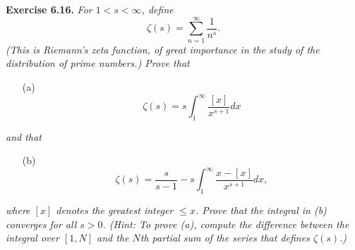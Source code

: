 \documentclass{article}
\begin{document}
\textbf{Exercise 6.16.}
\emph{For $1 < s < \infty$, define
\[
  \zeta(s) = \sum_{n=1}^{\infty} \frac{1}{n^s}.
\]
(This is Riemann's zeta function, of great importance in the study of the
distribution of prime numbers.)
Prove that}
\begin{enumerate}
  \item[(a)]
  \[
    \zeta(s) = s \int_{1}^{\infty} \frac{[x]}{x^{s+1}} dx
  \]
\end{enumerate}
\emph{and that}
\begin{enumerate}
  \item[(b)]
  \[
    \zeta(s) = \frac{s}{s-1} - s \int_{1}^{\infty} \frac{x - [x]}{x^{s+1}} dx,
  \]
\end{enumerate}
\emph{where $[x]$ denotes the greatest integer $\leq x$.
Prove that the integral in (b) converges for all $s > 0$.
(Hint: To prove (a), compute the difference between the integral over $[1,N]$
and the $N$th partial sum of the series that defines $\zeta(s)$.)} \\
\end{document}
